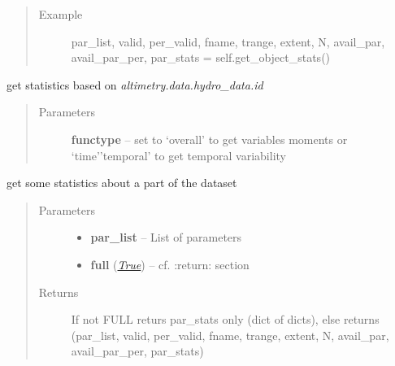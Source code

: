 \documentclass[letterpaper,10pt,english]{sphinxmanual}
\begin{document}
\begin{fulllineitems}
\begin{fulllineitems}
\begin{quote}
\begin{description}
\item[{Example }] \leavevmode
par\_list, valid, per\_valid, fname, trange, extent, N, avail\_par, avail\_par\_per, par\_stats = self.get\_object\_stats()

\end{description}\end{quote}

\end{fulllineitems}


\begin{fulllineitems}
\label{altimetry.data:altimetry.data.hydro_data.get_platform_stats}
get statistics based on \emph{altimetry.data.hydro\_data.id}
\begin{quote}\begin{description}
\item[{Parameters}] \leavevmode
\textbf{functype} -- set to `overall' to get variables moments or `time'\textbar{}'temporal' to get temporal variability

\end{description}\end{quote}

\end{fulllineitems}


\begin{fulllineitems}
\label{altimetry.data:altimetry.data.hydro_data.get_stats}
get some statistics about a part of the dataset
\begin{quote}\begin{description}
\item[{Parameters}] \leavevmode\begin{itemize}
\item {} 
\textbf{par\_list} -- List of parameters

\item {} 
\textbf{full} (\href{http://docs.python.org/library/constants.html\#True}{\emph{True}}) -- cf. :return: section

\end{itemize}

\item[{Returns}] \leavevmode
If not FULL returs par\_stats only (dict of dicts), else returns (par\_list, valid, per\_valid, fname, trange, extent, N, avail\_par, avail\_par\_per, par\_stats)


\end{description}
\end{quote}
\end{fulllineitems}
\end{fulllineitems}
\end{document}
